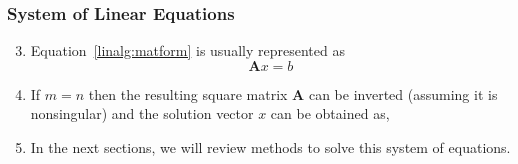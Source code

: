 \documentclass[10pt,compress]{beamer}
\begin{document}
\begin{frame}
  \frametitle{System of Linear Equations} 
  \begin{enumerate}
  \setcounter{enumi}{2}
    \item <1-> Equation~\ref{linalg:matform} is usually represented as 
        \begin{equation}
          \bm{A} x = b\label{linalg:linalg}
         \end{equation}
    \item <2-> If $m=n$ then the resulting square matrix $\bm{A}$ can be inverted (assuming it is nonsingular) and the solution vector $x$ can be obtained as,
    \item <4-> In the next sections, we will review methods to solve this system of equations.
  \end{enumerate}
\end{frame}
\end{document}
